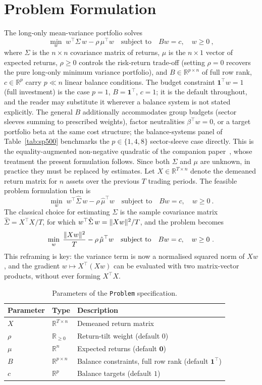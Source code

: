 \section{Problem Formulation}\label{sec:problem}
The long-only mean-variance portfolio solves
\[
\min_{w}\; w^\top\Sigma\, w - \rho\,\mu^\top w
\quad\text{subject to}\quad
Bw = c,\quad w\geq 0~,
\]
where $\Sigma$ is the $n\times n$ covariance matrix of returns, $\mu$ is the $n\times 1$ vector of expected returns, $\rho\geq 0$ controls the risk-return trade-off (setting $\rho=0$ recovers the pure long-only minimum variance portfolio), and $B \in \mathbb{R}^{p\times n}$ of full row rank, $c \in \mathbb{R}^p$ carry $p \ll n$ linear balance conditions. The budget constraint $\mathbf{1}^\top w = 1$ (full investment) is the case $p=1$, $B = \mathbf{1}^\top$, $c = 1$; it is the default throughout, and the reader may substitute it wherever a balance system is not stated explicitly. The general $B$ additionally accommodates group budgets (sector sleeves summing to prescribed weights), factor neutralities $\beta^\top w = 0$, or a target portfolio beta at the same cost structure; the balance-systems panel of Table~\ref{tab:sp500} benchmarks the $p\in\{1,4,8\}$ sector-sleeve case directly. This is the equality-augmented non-negative quadratic of the companion paper~\cite{schmelzer2026nncg}, whose treatment the present formulation follows.
Since both $\Sigma$ and
$\mu$ are unknown, in practice they must be replaced by estimates. Let $X\in\mathbb{R}^{T\times n}$ denote the demeaned return matrix for $n$ assets over the previous $T$ trading periods. The feasible problem formulation then is
\[
\min_{w}\; w^\top\hat\Sigma\, w - \rho\,\hat\mu^\top w
\quad\text{subject to}\quad
Bw = c,\quad w\geq 0~.
\]
The classical choice for estimating $\Sigma$ is
the sample covariance matrix $\hat\Sigma = X^\top X/T$, for which $w^\top\hat\Sigma\, w = \lVert Xw \rVert^2/T$, and the problem becomes
\[
\min_{w}\;\frac{\lVert Xw \rVert^2}{T} - \rho\,\hat\mu^\top w
\quad\text{subject to}\quad
Bw = c,\quad w\geq 0~.
\]
This reframing is key: the variance term is now a normalised squared norm of $Xw$, and the gradient $w\mapsto X^\top(Xw)$ can be evaluated with two matrix-vector products, without ever forming $X^\top X$.

\begin{table}[ht]
\centering
\begin{tabular}{lll}
\toprule
Parameter & Type & Description \\
\midrule
$X$        & $\mathbb{R}^{T \times n}$ & Demeaned return matrix \\
$\rho$     & $\mathbb{R}_{\geq 0}$     & Return-tilt weight (default $0$) \\
$\mu$      & $\mathbb{R}^n$            & Expected returns (default $\mathbf{0}$) \\
$B$        & $\mathbb{R}^{p \times n}$ & Balance constraints, full row rank (default $\mathbf{1}^\top$) \\
$c$        & $\mathbb{R}^{p}$          & Balance targets (default $1$) \\
\bottomrule
\end{tabular}
\caption{Parameters of the \texttt{Problem} specification.}
\label{tab:params}
\end{table}


